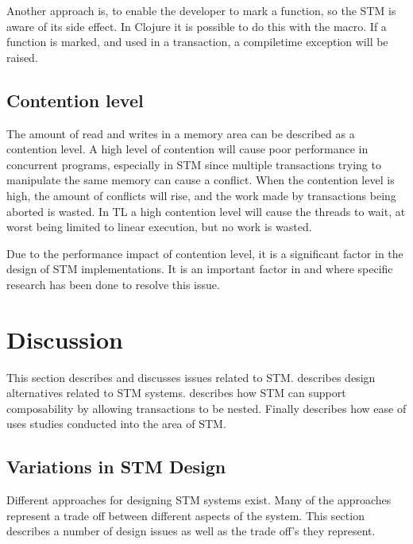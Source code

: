 Another approach is, to enable the developer to mark a function, so the \ac{STM} is aware of its side effect. In Clojure it is possible to do this with the  macro. If a function is marked, and used in a transaction, a compiletime exception will be raised.

\subsection{Contention level}
The amount of read and writes in a memory area can be described as a contention level\cite[p. 2084]{herlihy2011tm}. A high level of contention will cause poor performance in concurrent programs, especially in \ac{STM} since multiple transactions trying to manipulate the same memory can cause a conflict. When the contention level is high, the amount of conflicts will rise, and the work made by transactions being aborted is wasted. In \ac{TL} a high contention level will cause the threads to wait, at worst being limited to linear execution, but no work is wasted. 

Due to the performance impact of contention level, it is a significant factor in the design of \ac{STM} implementations. It is an important factor in \cite{harris2003language} and \cite{herlihy2008transactional} where specific research has been done to resolve this issue.

\section{Discussion}
\label{sec:stm_discussion}
This section describes and discusses issues related to \ac{STM}.  describes design alternatives related to \ac{STM} systems.  describes how \ac{STM} can support composability by allowing transactions to be nested. Finally  describes how ease of uses studies conducted into the area of \ac{STM}.

\subsection{Variations in \ac{STM} Design}\label{subsec:stm:variations_in_design}
Different approaches for designing \ac{STM} systems exist. Many of the approaches represent a trade off between different aspects of the system. This section describes a number of design issues as well as the trade off's they represent.

